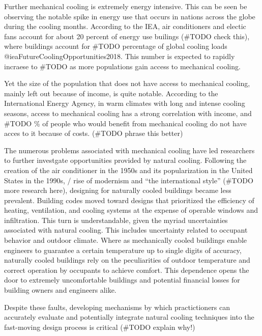 \documentclass[
  letterpaper,
  DIV=11,
  numbers=noendperiod]{scrartcl}
\begin{document}
Further mechanical cooling is extremely energy intensive. This can be
seen be observing the notable spike in energy use that occurs in nations
across the globe during the cooling months. According to the IEA, air
conditioners and electic fans account for about 20 percent of energy use
builings (\#TODO check this), where buildings account for \#TODO
percentage of global cooling loads @ieaFutureCoolingOpportunities2018.
This number is expected to rapidly incraese to \#TODO as more
populations gain access to mechanical cooling.

Yet the size of the population that does not have access to mechanical
cooling, mainly left out because of income, is quite notable. According
to the International Energy Agency, in warm climates with long and
intense cooling seasons, access to mechanical cooling has a strong
correlation with income, and \#TODO \% of people who would benefit from
mechanical cooling do not have acces to it because of costs. (\#TODO
phrase this better)

The numerous problems associated with mechanical cooling have led
researchers to further investgate opportunities provided by natural
cooling. Following the creation of the air conditioner in the 1950s and
its popularization in the United States in the 1990s, / rise of
modernism and ``the international style'' (\#TODO more research here),
designing for naturally cooled buildings became less prevalent. Building
codes moved toward designs that prioritized the efficiency of heating,
ventilation, and cooling systems at the expense of operable windows and
infiltration. This turn is understandable, given the myriad
uncertainties associated with natural cooling. This includes uncertainty
related to occupant behavior and outdoor climate. Where as mechanically
cooled buildings enable engineers to guarantee a certain temperature up
to single digits of accuracy, naturally cooled buildings rely on the
peculiarities of outdoor temperature and correct operation by occupants
to achieve comfort. This dependence opens the door to extremely
uncomfortable buildings and potential financial losses for building
owners and engineers alike.

Despite these faults, developing mechanisms by which practictioners can
accurately evaluate and potentially integrate natural cooling techniques
into the fast-moving design process is critical (\#TODO explain why!)
\end{document}
